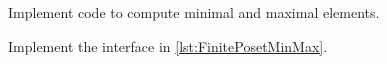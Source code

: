 
\begin{codeexercise}
    Implement code to compute minimal and maximal elements.

    Implement the interface in \cref{lst:FinitePosetMinMax}.
\end{codeexercise}

